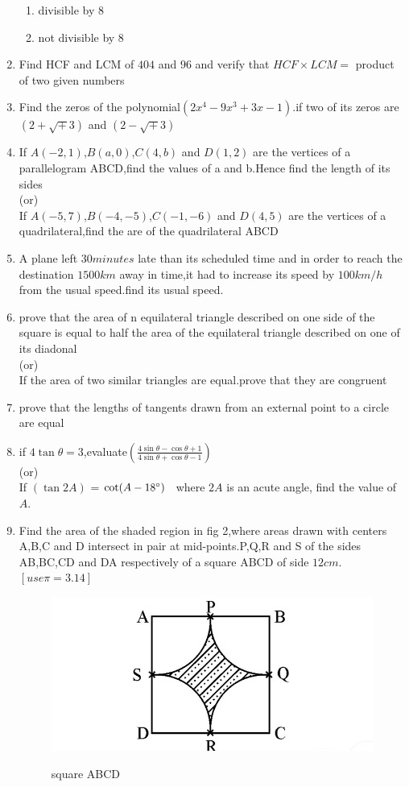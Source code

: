 \documentclass{article}
\begin{document}
\begin{enumerate}
	\begin{enumerate}[label=\roman*)]
		\item divisible by $8$
		\item not divisible by $8$
	\end{enumerate}
\item Find HCF and LCM of $404$ and $96$ and verify that $HCF \times LCM =$ product of two given numbers
		\item Find the zeros of the polynomial$(2x^4-9x^3+3x-1)$.if two of its zeros are $(2+\sqrt+3)$ and $(2-\sqrt+3)$
		\item If $A(-2,1)$,$B(a,0)$,$C(4,b)$ and $D(1,2)$ are the vertices of a parallelogram ABCD,find the values of a and b.Hence find the length of its sides\\
										(or)\\
			If $A(-5,7)$,$B(-4,-5)$,$C(-1,-6)$ and $D(4,5)$ are the vertices of a quadrilateral,find the are of the quadrilateral ABCD
		\item A plane left $30 minutes$ late than its scheduled time and in order to reach the destination $1500km$ away in time,it had to increase its speed by $100km/h$ from the usual speed.find its usual speed.
		\item prove that the area of n equilateral triangle described on one side of the square is equal to half the area of the equilateral triangle described on one of its diadonal\\
			(or)\\
			If the area of two similar triangles are equal.prove that they are congruent
		\item prove that the lengths of tangents drawn from an external point to a circle are equal
		\item if $4\tan\theta=3$,evaluate$(\frac {4\sin\theta-\cos\theta+1} {4\sin\theta+\cos\theta-1})$\\
			(or)\\
			If $( \tan 2A)$ = $\cot(A - 18\degree)$ \ where \( 2A \) is an acute angle, find the value of \( A \). 
		\item Find the area of the shaded region in fig 2,where areas drawn with centers A,B,C and D intersect in pair at mid-points.P,Q,R and S of the sides AB,BC,CD and DA respectively of a square ABCD of side $12cm$.$[use \pi=3.14]$ \\

			\begin{figure}[H]
			\centering
\includegraphics [width=\columnwidth] {./IMG3.jpg} 
		\label{fig:fig2}
\caption{square ABCD} 
\end{figure}
	


\end{enumerate}
\end{document}

